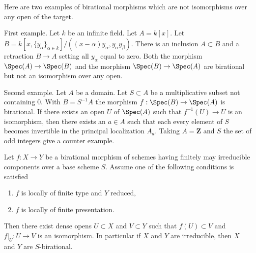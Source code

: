 \begin{example}
\label{example-birational-not-iso-over-open}
Here are two examples of birational morphisms which are not isomorphisms
over any open of the target.

\medskip\noindent
First example. Let $k$ be an infinite field. Let $A = k[x]$. Let
$B = k[x, \{y_{\alpha}\}_{\alpha \in k}]/
((x-\alpha)y_\alpha, y_\alpha y_\beta)$.
There is an inclusion $A \subset B$ and a retraction $B \to A$
setting all $y_\alpha$ equal to zero.
Both the morphism $\Spec(A) \to \Spec(B)$
and the morphism $\Spec(B) \to \Spec(A)$ are birational
but not an isomorphism over any open.

\medskip\noindent
Second example. Let $A$ be a domain. Let $S \subset A$ be a multiplicative
subset not containing $0$.
With $B = S^{-1}A$ the morphism $f : \Spec(B) \to \Spec(A)$
is birational. If there exists an open $U$ of $\Spec(A)$
such that $f^{-1}(U) \to U$ is an isomorphism, then there exists an
$a \in A$ such that each every element of $S$ becomes invertible
in the principal localization $A_a$. Taking $A = \mathbf{Z}$
and $S$ the set of odd integers give a counter example.
\end{example}

\begin{lemma}
\label{lemma-birational-birational}
Let $f : X \to Y$ be a birational morphism of schemes having finitely
may irreducible components over a base scheme $S$. Assume one of the
following conditions is satisfied
\begin{enumerate}
\item $f$ is locally of finite type and $Y$ reduced,
\item $f$ is locally of finite presentation.
\end{enumerate}
Then there exist dense opens $U \subset X$ and $V \subset Y$
such that $f(U) \subset V$ and $f|_U : U \to V$ is an isomorphism.
In particular if $X$ and $Y$ are irreducible, then
$X$ and $Y$ are $S$-birational.
\end{lemma}

